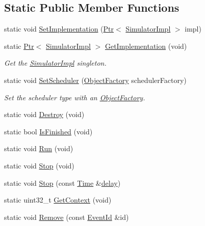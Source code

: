 \subsection*{Static Public Member Functions}
\begin{DoxyCompactItemize}
\item 
static void \hyperlink{classns3_1_1Simulator_ae9c56e0f229fd981f5fdf99650953473}{Set\+Implementation} (\hyperlink{classns3_1_1Ptr}{Ptr}$<$ \hyperlink{classns3_1_1SimulatorImpl}{Simulator\+Impl} $>$ impl)
\item 
static \hyperlink{classns3_1_1Ptr}{Ptr}$<$ \hyperlink{classns3_1_1SimulatorImpl}{Simulator\+Impl} $>$ \hyperlink{classns3_1_1Simulator_afdbe7c7695132b3fae7cb0b5d67c04e3}{Get\+Implementation} (void)
\begin{DoxyCompactList}\small\item\em Get the \hyperlink{classns3_1_1SimulatorImpl}{Simulator\+Impl} singleton. \end{DoxyCompactList}\item 
static void \hyperlink{classns3_1_1Simulator_a926ae3f3fc64b7ca23460a0bae02acd4}{Set\+Scheduler} (\hyperlink{classns3_1_1ObjectFactory}{Object\+Factory} scheduler\+Factory)
\begin{DoxyCompactList}\small\item\em Set the scheduler type with an \hyperlink{classns3_1_1ObjectFactory}{Object\+Factory}. \end{DoxyCompactList}\item 
static void \hyperlink{classns3_1_1Simulator_a2a056e59a6623225df0957eda0ee8252}{Destroy} (void)
\item 
static bool \hyperlink{classns3_1_1Simulator_aa8c662d04480705d09b3d65b4dea9d2f}{Is\+Finished} (void)
\item 
static void \hyperlink{classns3_1_1Simulator_a84be982e6d03b62c3dc3303c75a9b909}{Run} (void)
\item 
static void \hyperlink{classns3_1_1Simulator_a2335ba5b62e9066e893fecb21b7f6afd}{Stop} (void)
\item 
static void \hyperlink{classns3_1_1Simulator_a284c1c07f673c0fc49b5b732bb24bd5d}{Stop} (const \hyperlink{classns3_1_1Time}{Time} \&\hyperlink{mmwave_2model_2fading-traces_2fading__trace__generator_8m_a7964e6aa8f61a9d28973c8267a606ad8}{delay})
\item 
static uint32\+\_\+t \hyperlink{classns3_1_1Simulator_a8514b74ee2c42916b351b33c4a963bb0}{Get\+Context} (void)
\item 
static void \hyperlink{classns3_1_1Simulator_ae30cacdda6cd0d5d62a8f2097b320506}{Remove} (const \hyperlink{classns3_1_1EventId}{Event\+Id} \&id)

\end{DoxyCompactItemize}

